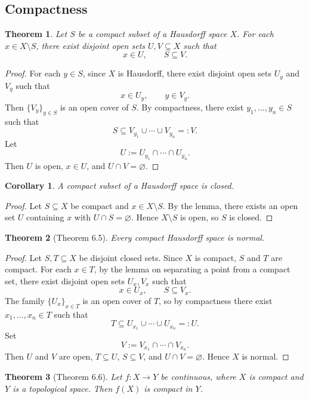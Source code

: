 \documentclass[12pt]{article}
\newtheorem{theorem}{Theorem}
\newtheorem{corollary}{Corollary}
\begin{document}
\subsection*{Compactness}
\begin{theorem}
Let $S$ be a compact subset of a Hausdorff space $X$. For each $x \in X \setminus S$, there exist disjoint open sets $U,V \subseteq X$ such that
\[
x \in U, \qquad S \subseteq V.
\]
\end{theorem}

\begin{proof}
For each $y \in S$, since $X$ is Hausdorff, there exist disjoint open sets $U_y$ and $V_y$ such that
\[
x \in U_y, \qquad y \in V_y.
\]
Then $\{V_y\}_{y\in S}$ is an open cover of $S$. By compactness, there exist $y_1,\dots,y_n \in S$ such that
\[
S \subseteq V_{y_1} \cup \cdots \cup V_{y_n} =: V.
\]
Let
\[
U := U_{y_1} \cap \cdots \cap U_{y_n}.
\]
Then $U$ is open, $x \in U$, and $U \cap V = \varnothing$.
\end{proof}

\begin{corollary}
A compact subset of a Hausdorff space is closed.
\end{corollary}

\begin{proof}
Let $S \subseteq X$ be compact and $x \in X \setminus S$. By the lemma, there exists an open set $U$ containing $x$ with $U \cap S = \varnothing$. Hence $X \setminus S$ is open, so $S$ is closed.
\end{proof}

\begin{theorem}[Theorem 6.5]
Every compact Hausdorff space is normal.
\end{theorem}

\begin{proof}
Let $S,T \subseteq X$ be disjoint closed sets. Since $X$ is compact, $S$ and $T$ are compact. For each $x\in T$, by the lemma on separating a point from a compact set, there exist disjoint open sets $U_x,V_x$ such that
\[
x\in U_x, \qquad S\subseteq V_x.
\]
The family $\{U_x\}_{x\in T}$ is an open cover of $T$, so by compactness there exist $x_1,\dots,x_n\in T$ such that
\[
T\subseteq U_{x_1}\cup\cdots\cup U_{x_n}=:U.
\]
Set
\[
V:=V_{x_1}\cap\cdots\cap V_{x_n}.
\]
Then $U$ and $V$ are open, $T\subseteq U$, $S\subseteq V$, and $U\cap V=\varnothing$. Hence $X$ is normal.
\end{proof}

\begin{theorem}[Theorem 6.6]
Let $f:X\to Y$ be continuous, where $X$ is compact and $Y$ is a topological space. Then $f(X)$ is compact in $Y$.
\end{theorem}
\end{document}
